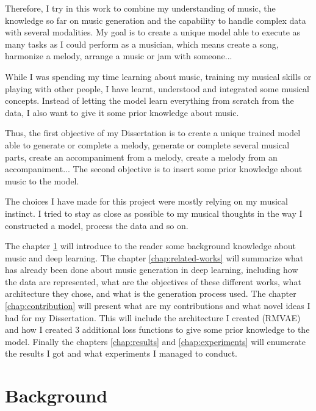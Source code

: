 \documentclass[12pt]{report}
\begin{document}
Therefore, I try in this work to combine my understanding of music, the knowledge so far on music generation and the capability to handle complex data with several modalities.
My goal is to create a unique model able to execute as many tasks as I could perform as a musician, which means create a song, harmonize a melody, arrange a music or jam with someone...

While I was spending my time learning about music, training my musical skills or playing with other people, I have learnt, understood and integrated some musical concepts.
Instead of letting the model learn everything from scratch from the data, I also want to give it some prior knowledge about music.

Thus, the first objective of my Dissertation is to create a unique trained model able to generate or complete a melody, generate or complete several musical parts, create an accompaniment from a melody, create a melody from an accompaniment...
The second objective is to insert some prior knowledge about music to the model.

The choices I have made for this project were mostly relying on my musical instinct.
I tried to stay as close as possible to my musical thoughts in the way I constructed a model, process the data and so on.

The chapter \ref{chap:background} will introduce to the reader some background knowledge about music and deep learning.
The chapter \ref{chap:related-works} will summarize what has already been done about music generation in deep learning, including how the data are represented, what are the objectives of these different works, what architecture they chose, and what is the generation process used.
The chapter \ref{chap:contribution} will present what are my contributions and what novel ideas I had for my Dissertation.
This will include the architecture I created (RMVAE) and how I created 3 additional loss functions to give some prior knowledge to the model.
Finally the chapters \ref{chap:results} and \ref{chap:experiments} will enumerate the results I got and what experiments I managed to conduct.


\chapter{Background}
\label{chap:background}
\end{document}
